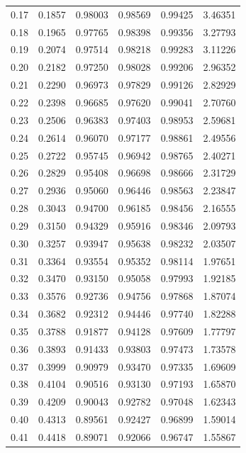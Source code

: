 \begin{minipage}{0.48\textwidth}
\begin{tabular}{c|c|c|c|c|c}
        0.17 & 0.1857 & 0.98003 & 0.98569 & 0.99425 & 3.46351 \\
        0.18 & 0.1965 & 0.97765 & 0.98398 & 0.99356 & 3.27793 \\
        0.19 & 0.2074 & 0.97514 & 0.98218 & 0.99283 & 3.11226 \\
        0.20 & 0.2182 & 0.97250 & 0.98028 & 0.99206 & 2.96352 \\
        0.21 & 0.2290 & 0.96973 & 0.97829 & 0.99126 & 2.82929 \\
        0.22 & 0.2398 & 0.96685 & 0.97620 & 0.99041 & 2.70760 \\
        0.23 & 0.2506 & 0.96383 & 0.97403 & 0.98953 & 2.59681 \\
        0.24 & 0.2614 & 0.96070 & 0.97177 & 0.98861 & 2.49556 \\
        0.25 & 0.2722 & 0.95745 & 0.96942 & 0.98765 & 2.40271 \\
        0.26 & 0.2829 & 0.95408 & 0.96698 & 0.98666 & 2.31729 \\
        0.27 & 0.2936 & 0.95060 & 0.96446 & 0.98563 & 2.23847 \\
        0.28 & 0.3043 & 0.94700 & 0.96185 & 0.98456 & 2.16555 \\
        0.29 & 0.3150 & 0.94329 & 0.95916 & 0.98346 & 2.09793 \\
        0.30 & 0.3257 & 0.93947 & 0.95638 & 0.98232 & 2.03507 \\ \arrayrulecolor{Red}\hline\arrayrulecolor{black}
        0.31 & 0.3364 & 0.93554 & 0.95352 & 0.98114 & 1.97651 \\
        0.32 & 0.3470 & 0.93150 & 0.95058 & 0.97993 & 1.92185 \\
        0.33 & 0.3576 & 0.92736 & 0.94756 & 0.97868 & 1.87074 \\
        0.34 & 0.3682 & 0.92312 & 0.94446 & 0.97740 & 1.82288 \\
        0.35 & 0.3788 & 0.91877 & 0.94128 & 0.97609 & 1.77797 \\
        0.36 & 0.3893 & 0.91433 & 0.93803 & 0.97473 & 1.73578 \\
        0.37 & 0.3999 & 0.90979 & 0.93470 & 0.97335 & 1.69609 \\
        0.38 & 0.4104 & 0.90516 & 0.93130 & 0.97193 & 1.65870 \\
        0.39 & 0.4209 & 0.90043 & 0.92782 & 0.97048 & 1.62343 \\
        0.40 & 0.4313 & 0.89561 & 0.92427 & 0.96899 & 1.59014 \\
        0.41 & 0.4418 & 0.89071 & 0.92066 & 0.96747 & 1.55867 \\

\end{tabular}
\end{minipage}

